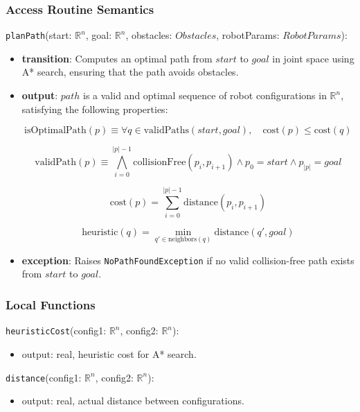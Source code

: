 \documentclass[12pt, titlepage]{article}
\begin{document}
\subsubsection{Access Routine Semantics}

\noindent \texttt{planPath}(start: \( \mathbb{R}^n \), goal: \( \mathbb{R}^n \), obstacles: \( Obstacles \), robotParams: \( RobotParams \)):

\begin{itemize}
  \item \textbf{transition}: Computes an optimal path from \(start\) to \(goal\) in joint space using A* search, ensuring that the path avoids obstacles.

  \item \textbf{output}: \( path \) is a valid and optimal sequence of robot configurations in \( \mathbb{R}^n \), satisfying the following properties:

\[
\text{isOptimalPath}(p) \equiv \forall q \in \text{validPaths}(start, goal), \quad \text{cost}(p) \leq \text{cost}(q)
\]

\[
\text{validPath}(p) \equiv \bigwedge_{i=0}^{|p|-1} \text{collisionFree}(p_i, p_{i+1}) \wedge p_0 = start \wedge p_{|p|} = goal
\]

\[
\text{cost}(p) = \sum_{i=0}^{|p|-1} \text{distance}(p_i, p_{i+1})
\]

\[
\text{heuristic}(q) = \min_{q' \in \text{neighbors}(q)} \text{distance}(q', goal)
\]

  \item \textbf{exception}: Raises \texttt{NoPathFoundException} if no valid collision-free path exists from \( start \) to \( goal \).
\end{itemize}

\subsubsection{Local Functions}


\noindent \texttt{heuristicCost}(config1: $\mathbb{R}^n$, config2: $\mathbb{R}^n$):
\begin{itemize}
  \item output: real, heuristic cost for A* search.
\end{itemize}

\noindent \texttt{distance}(config1: $\mathbb{R}^n$, config2: $\mathbb{R}^n$):
\begin{itemize}
  \item output: real, actual distance between configurations.
\end{itemize}
\end{document}
